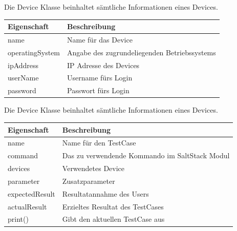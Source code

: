 \documentclass[a4,12pt]{scrartcl}
\begin{document}
Die Device Klasse beinhaltet sämtliche Informationen eines Devices.
\noindent \begin{table}[H]
\centering
    \begin{tabular}{@{}l p{12cm} @{}}\toprule    
    {Eigenschaft} & {Beschreibung}\\ \midrule      
    name & Name für das Device \\
    operatingSystem & Angabe des zugrundeliegenden Betriebssystems\\
    ipAddress & IP Adresse des Devices\\
    userName & Username fürs Login\\
    password & Passwort fürs Login\\
    \bottomrule
    \end{tabular}
\end{table}
Die Device Klasse beinhaltet sämtliche Informationen eines Devices.
\noindent \begin{table}[H]
\centering
    \begin{tabular}{@{}l p{12cm} @{}}\toprule    
    {Eigenschaft} & {Beschreibung}\\ \midrule      
    name & Name für den TestCase \\
    command & Das zu verwendende Kommando im SaltStack Modul\\
    devices & Verwendetes Device\\
    parameter & Zusatzparameter\\
    expectedResult & Resultatannahme des Users\\
    actualResult & Erzieltes Resultat des TestCases\\
    print() & Gibt den aktuellen TestCase aus\\
    \bottomrule
    \end{tabular}
\end{table}
\newpage
\end{document}
